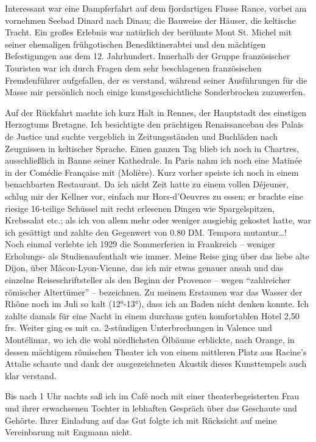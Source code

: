 \documentclass[a5paper,pagesize,10pt,twoside=true]{scrbook}
\begin{document}
Interessant war eine Dampferfahrt auf dem fjordartigen Flusse Rance, vorbei am vornehmen Seebad Dinard nach Dinau; die Bauweise der Häuser, die keltische Tracht. Ein großes Erlebnis war natürlich der berühmte Mont St. Michel mit seiner ehemaligen frühgotischen Benediktinerabtei und den mächtigen Befestigungen aus dem 12. Jahrhundert. Innerhalb der Gruppe französischer Touristen war ich durch Fragen dem sehr beschlagenen französischen Fremdenführer aufgefallen, der es verstand, während seiner Ausführungen für die Masse mir persönlich noch einige kunstgeschichtliche Sonderbrocken zuzuwerfen.

Auf der Rückfahrt machte ich kurz Halt in Rennes, der Hauptstadt des einstigen Herzogtums Bretagne. Ich besichtigte den prächtigen Renaissancebau des Palais de Justice und suchte vergeblich in Zeitungsständen und Buchläden nach Zeugnissen in keltischer Sprache. Einen ganzen Tag blieb ich noch in Chartres, ausschließlich in Banne seiner Kathedrale. In Paris nahm ich noch eine Matinée in der Comédie Française mit (Molière). Kurz vorher speiste ich noch in einem benachbarten Restaurant. Da ich nicht Zeit hatte zu einem vollen Déjeuner, schlug mir der Kellner vor, einfach nur Hors-d'Oeuvres zu essen; er brachte eine riesige 16-teilige Schüssel mit recht erlesenen Dingen wie Spargelspitzen, Krebssalat etc.; als ich von allem mehr oder weniger ausgiebig gekostet hatte, war ich gesättigt und zahlte den Gegenwert von 0.80 DM. Tempora mutantur\dots!\\

Noch einmal verlebte ich 1929 die Sommerferien in Frankreich -- weniger Erholungs- als Studienaufenthalt wie immer. Meine Reise ging über das liebe alte Dijon, über Mâcon-Lyon-Vienne, das ich mir etwas genauer ansah und das einzelne Reiseschriftsteller als den Beginn der Provence -- wegen \enquote{zahlreicher römischer Altertümer} -- bezeichnen. Zu meinem Erstaunen war das Wasser der Rhône noch im Juli so kalt (12°-13°), dass ich an Baden nicht denken konnte. Ich zahlte damals für eine Nacht in einem durchaus guten komfortablen Hotel 2,50 frs. Weiter ging es mit ca. 2-stündigen Unterbrechungen in Valence und Montélimar, wo ich die wohl nördlichsten Ölbäume erblickte, nach Orange, in dessen mächtigem römischen Theater ich von einem mittleren Platz aus Racine's Attalie schaute und dank der ausgezeichneten Akustik dieses Kunsttempels auch klar verstand.

Bis nach 1 Uhr nachts saß ich im Café noch mit einer theaterbegeisterten Frau und ihrer erwachsenen Tochter in lebhaften Gespräch über das Geschaute und Gehörte. Ihrer Einladung auf das Gut folgte ich mit Rücksicht auf meine Vereinbarung mit Engmann nicht.
\end{document}
